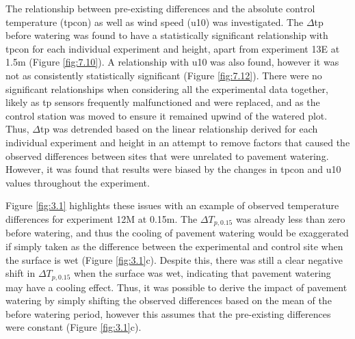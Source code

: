\documentclass[final,3p,times,authoryear]{elsarticle}
\begin{document}
The relationship between pre-existing differences and the absolute control temperature
(\gls{tpcon}) as well as wind speed (\gls{u10}) was investigated. The $\Delta$\gls{tp} before watering was found to have a statistically significant relationship with \gls{tpcon} for each individual experiment and height, apart from experiment 13E at 1.5m (Figure \ref{fig:7.10}). A relationship with \gls{u10} was also found, however it was not as consistently statistically significant (Figure \ref{fig:7.12}). There were no significant relationships when considering all the experimental data together, likely as \gls{tp} sensors frequently malfunctioned and were replaced, and as the control station was moved to ensure it remained upwind of the watered plot. Thus, $\Delta$\gls{tp} was detrended based on the linear relationship derived for each individual experiment and height in an attempt to remove factors that caused the observed
differences between sites that were unrelated to pavement watering. However, it was
found that results were biased by the changes in \gls{tpcon} and \gls{u10} values throughout the experiment.

Figure \ref{fig:3.1} highlights these issues with an example of observed temperature differences for experiment 12M at 0.15m. The $\Delta$$T_{p,0.15}$ was already less than zero before watering, and thus the cooling of pavement watering would be exaggerated if simply taken as the difference between the experimental and control site when the surface is wet (Figure \ref{fig:3.1}c). Despite this, there was still a clear negative shift in $\Delta$$T_{p,0.15}$ when the surface was wet, indicating that pavement watering may have a cooling effect. Thus, it was possible to derive the impact of pavement watering by simply shifting the observed differences based on the mean of the before watering period, however this assumes that the pre-existing differences were constant (Figure \ref{fig:3.1}c).
\end{document}
